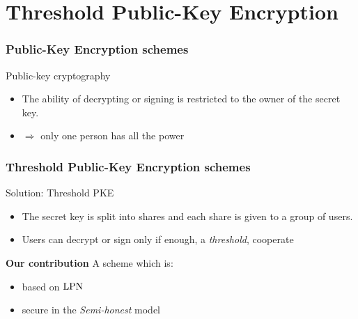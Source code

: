 \section{Threshold Public-Key Encryption}

\begin{frame}
\frametitle{Public-Key Encryption schemes}

\begin{center}\end{center}

\begin{block}{Public-key cryptography}  
  \begin{itemize}
   \item<2-> The ability of decrypting or signing is restricted to the owner of the secret key.
   \item<3-> $\Rightarrow$ \alert{only one person has all the power} 
  \end{itemize}  
 \end{block}
 \end{frame}
 

 \begin{frame}
 \frametitle{Threshold Public-Key Encryption schemes}
 \begin{block}{Solution: Threshold PKE}
 \begin{itemize}[<+->]
  \item The secret key is split into shares and each share is given to a group of users.
  \item Users can decrypt or sign only if enough, a \emph{threshold}, cooperate
  \end{itemize}  
 \end{block}
 
 \begin{block}{\textbf{Our contribution}}
 A {\color{red}{Threshold Public-Key Encryption}} scheme which is:
 \begin{itemize}
   \item<4-> based on $\mathrm{LPN}$
   \item<5-> secure in the \emph{Semi-honest} model
  \end{itemize}

 \end{block}

\end{frame}

